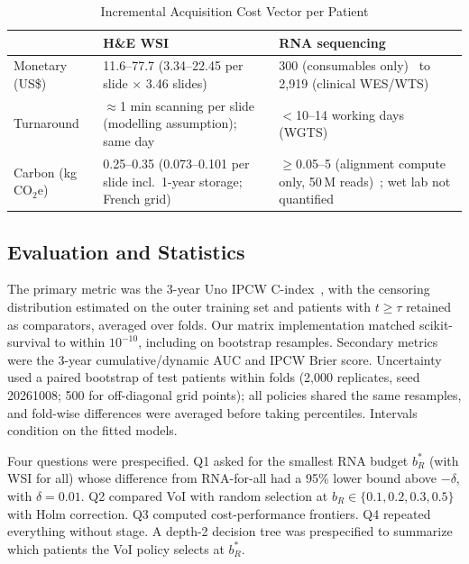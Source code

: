 \documentclass[journal,twoside,web]{IEEEtran}
\begin{document}
\begin{table}[t]
\centering
\caption{Incremental Acquisition Cost Vector per Patient}
\label{tab:cost}
\setlength{\tabcolsep}{3pt}
\begin{tabular}{@{}p{1.5cm}p{3.1cm}p{3.15cm}@{}}
\toprule
 & H\&E WSI & RNA sequencing \\
\midrule
Monetary (US\$) & 11.6--77.7 (3.34--22.45 per slide $\times$ 3.46 slides)~\cite{ardon2023} & 300 (consumables only)~\cite{altburger2026} to 2,919 (clinical WES/WTS)~\cite{ortendahl2025} \\
Turnaround & $\approx$1 min scanning per slide (modelling assumption); same day~\cite{vafaeisadr2024} & $<$10--14 working days (WGTS)~\cite{cuppen2022} \\
Carbon (kg CO$_2$e) & 0.25--0.35 (0.073--0.101 per slide incl.\ 1-year storage; French grid)~\cite{tilmant2026} & $\ge$0.05--5 (alignment compute only, 50\,M reads)~\cite{grealey2022}; wet lab not quantified \\
\bottomrule
\end{tabular}
\end{table}

\subsection{Evaluation and Statistics}
The primary metric was the 3-year Uno IPCW C-index~\cite{uno2011}, with the censoring distribution estimated on the outer training set and patients with $t \ge \tau$ retained as comparators, averaged over folds. Our matrix implementation matched scikit-survival to within $10^{-10}$, including on bootstrap resamples. Secondary metrics were the 3-year cumulative/dynamic AUC and IPCW Brier score. Uncertainty used a paired bootstrap of test patients within folds (2,000 replicates, seed 20261008; 500 for off-diagonal grid points); all policies shared the same resamples, and fold-wise differences were averaged before taking percentiles. Intervals condition on the fitted models.

Four questions were prespecified. Q1 asked for the smallest RNA budget $b_R^*$ (with WSI for all) whose difference from RNA-for-all had a 95\% lower bound above $-\delta$, with $\delta = 0.01$. Q2 compared VoI with random selection at $b_R \in \{0.1, 0.2, 0.3, 0.5\}$ with Holm correction. Q3 computed cost-performance frontiers. Q4 repeated everything without stage. A depth-2 decision tree was prespecified to summarize which patients the VoI policy selects at $b_R^*$.
\end{document}
